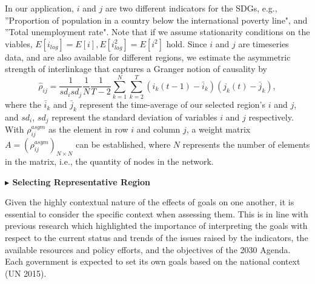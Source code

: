 \documentclass[12pt]{article}  %
\begin{document}
 In our application, $i$ and $j$ are two different indicators for the SDGs, e.g., ''Proportion of population in a country below the international poverty line", and ''Total unemployment rate".
 Note that if we assume stationarity conditions on the viables, $E[i_{lag}]=E[i],E[i_{lag}^2]=E[i^2]$ hold.  Since  $i$ and $j$ are
timeseries data, and are also available for different regions, we estimate  the asymmetric strength of interlinkage that
captures a Granger notion of causality by
\begin{equation}
\hat{\rho}_{ij}=\frac{1}{sd_isd_j}\frac{1}{N}\frac{1}{T-2}\sum_{k=1}^N{\sum_{k=2}^T{\left( i_k\left( t-1 \right) -\bar{i}_k \right) \left( j_k\left( t \right) -\bar{j}_k \right)}},
\label{eq:3.2}
\end{equation}
where the $\bar{i}_k$ and $\bar{j}_k$ represent the time-average of our selected region's $i$ and $j$, and $sd_{i}$, $sd_j$ represent the standard deviation of variables $i$ and $j$ respectively. With $\rho_{ij}^{asym}$ as the element in row $i$ and column $j$, a weight matrix $A=(\rho_{ij}^{asym})_{N\times N}$ can be established, where $N$ represents the number of elements in the matrix, i.e., the quantity of nodes in the network.


\vspace{0.7mm}\begin{itshape}
\textbf{$\blacktriangleright$ Selecting Representative Region}\end{itshape}



Given the highly contextual nature of the effects of goals on one another, it is essential to consider the specific context when assessing them. This is in line with previous research which highlighted the importance of interpreting the goals with respect to the current status and trends of the issues raised by the indicators, the available resources and policy efforts, and the objectives of the 2030 Agenda. Each government is expected to set its own goals based on the national context (UN 2015).
\end{document}
